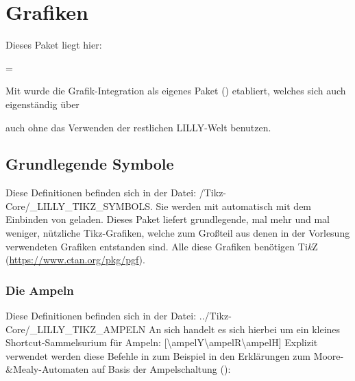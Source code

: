\normalmarginpar

\renewcommand{\arraystretch}{1.5}
\chapter[Grafiken \LILLYxBOXxVersion{\small 1.0.0}]{Grafiken}
\bigskip\newline
{}Dieses Paket liegt hier: \begin{center}
     = \T{\LILLYxPATHxGRAPHICS}
\end{center}
\begin{bemerkung}
    Mit  wurde die Grafik-Integration als eigenes Paket () etabliert, welches sich auch eigenständig über \begin{latex}
\usepackage{LILLYxGRAPHICS}
        \end{latex}
        auch ohne das Verwenden der restlichen LILLY-Welt benutzen.
\end{bemerkung}
%
%
%
\section{Grundlegende Symbole}
Diese Definitionen befinden sich in der Datei: {\ltt\LILLYxPATHxGRAPHICS/Tikz-Core/\_LILLY\_TIKZ\_SYMBOLS}. Sie werden mit  automatisch mit dem Einbinden von\newline {} geladen.\medskip\newline
Dieses Paket liefert grundlegende, mal mehr und mal weniger, nützliche Tikz-Grafiken, welche zum Großteil aus denen in der Vorlesung verwendeten Grafiken entstanden sind. Alle diese Grafiken benötigen Ti\textit{k}Z (\url{https://www.ctan.org/pkg/pgf}).
\subsection{Die Ampeln}
Diese Definitionen befinden sich in der Datei: {\ltt../Tikz-Core/\_LILLY\_TIKZ\_AMPELN}
An sich handelt es sich hierbei um ein kleines Shortcut-Sammelsurium für Ampeln:\medskip
%
%
%
[\cmdlist \textbackslash ampelY\cmdlist \textbackslash ampelR\cmdlist \textbackslash ampelH]
Explizit verwendet werden diese Befehle in zum Beispiel in den Erklärungen zum Moore-\&Mealy-Automaten auf Basis der Ampelschaltung (\!\ampelG\ampelY\ampelH):

